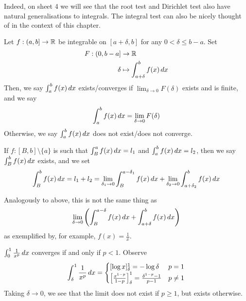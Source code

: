\documentclass{../template/note}
\begin{document}
    Indeed, on sheet 4 we will see that the root test and Dirichlet test also have natural generalisations to integrals. The integral test can also be nicely thought of in the context of this chapter.


    \begin{definition}
        Let \(f: (a, b] \to \mathbb R\) be integrable on \([a + \delta, b]\) for any \(0 < \delta \leq b-a\). Set 
        \begin{align*}
            F: (0, b-a] &\to \mathbb R \\
            \delta &\mapsto \int_{a+\delta}^b f(x) \,d{x}
        \end{align*}
        Then, we say \(\int_a^b f(x) \,d{x}\) exists/converges if \(\lim_{\delta \to 0} F(\delta)\) exists and is finite, and we say
        \begin{align*}
            \int_a^b f(x) \,d{x} = \lim_{\delta \to 0} F(\delta)
        \end{align*}
        Otherwise, we say \(\int_a^b f(x) \,d{x}\) does not exist/does not converge.

        If \(f: [B, b] \setminus \{a\}\) is such that \(\int_B^a f(x) \,d{x} = l_1\) and \(\int_a^b f(x) \,d{x} = l_2\), then we say \(\int_B^b f(x) \,d{x}\) exists, and we set
        \begin{align*}
            \int_B^b f(x) \,d{x} = l_1 + l_2 = \lim_{\delta_1 \to 0} \int_B^{a-\delta_1} f(x) \,d{x} + \lim_{\delta_2 \to 0} \int_{a+\delta_2}^b f(x) \,d{x}
        \end{align*}
    \end{definition}
    
    \begin{remark*}
        Analogously to above, this is not the same thing as
        \begin{align*}
            \lim_{\delta \to 0} \left(\int_B^{a-\delta} f(x) \,d{x} + \int_{a+\delta}^b f(x) \,d{x}\right)
        \end{align*}
        as exemplified by, for example, \(f(x) = \frac 1 x\).
    \end{remark*}
    
    \begin{example*}
        \(\int_0^1 \frac 1 {x^p} \,d{x}\) converges if and only if \(p < 1\). Observe
        \begin{align*}
            \int_\delta^1 \frac 1 {x^p} \,d{x} = \begin{cases}
                [\log x]_{\delta}^1 = -\log \delta & p = 1 \\
                \left[\frac{x^{1-p}}{1-p}\right]_\delta^1 = \frac{\delta^{1-p}-1}{p-1} & p \neq 1
            \end{cases}
        \end{align*}
        Taking \(\delta \to 0\), we see that the limit does not exist if \(p \geq 1\), but exists otherwise.
    \end{example*}
    
\end{document}
